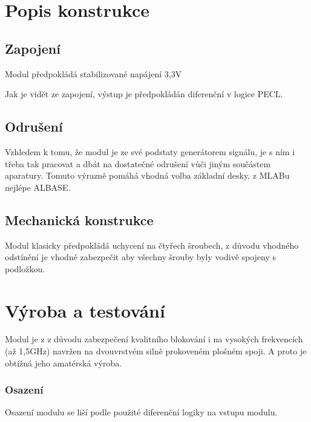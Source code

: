 \documentclass[12pt,a4paper,oneside]{article}
\begin{document}
\section{Popis konstrukce}
\subsection{Zapojení}

Modul předpokládá stabilizované napájení 3,3V



Jak je vidět ze zapojení, výstup je předpokládán diferenční v logice PECL. 

\subsection{Odrušení}

Vzhledem k tomu, že modul je ze své podstaty generátorem signálu, je s ním i třeba tak pracovat a dbát na dostatečné odrušení vůči jiným součástem aparatury. Tomuto výrazně pomáhá vhodná volba základní desky, z MLABu nejlépe ALBASE.

\subsection{Mechanická konstrukce}

Modul klasicky předpokládá uchycení na čtyřech šroubech, z důvodu vhodného odstínění je vhodné zabezpečit aby všechny šrouby byly vodivě spojeny s podložkou.  

\section{Výroba a testování}
Modul je z z důvodu zabezpečení kvalitního blokování i na vysokých frekvencích (až 1,5GHz) navržen na dvouvrstvém silně prokoveném plošném spoji. A proto je obtížná jeho amatérská výroba.

\subsubsection{Osazení}

Osazení modulu se liší podle použité diferenční logiky na vstupu modulu. 
\end{document}

